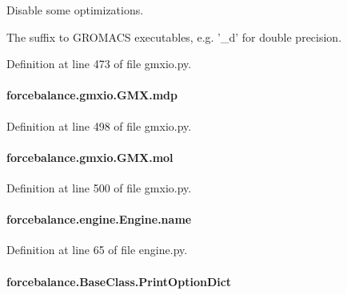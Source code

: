 Disable some optimizations. 

The suffix to G\-R\-O\-M\-A\-C\-S executables, e.\-g. '\-\_\-d' for double precision. 

Definition at line 473 of file gmxio.\-py.

\hypertarget{classforcebalance_1_1gmxio_1_1GMX_a6476e88d7e7aefec1fe2d07e30be2eb2}{
\paragraph[{mdp}]{\setlength{\rightskip}{0pt plus 5cm}forcebalance.\-gmxio.\-G\-M\-X.\-mdp}}\label{classforcebalance_1_1gmxio_1_1GMX_a6476e88d7e7aefec1fe2d07e30be2eb2}


Definition at line 498 of file gmxio.\-py.

\hypertarget{classforcebalance_1_1gmxio_1_1GMX_a7accb28dad3f9986cc8b622125feed5d}{
\paragraph[{mol}]{\setlength{\rightskip}{0pt plus 5cm}forcebalance.\-gmxio.\-G\-M\-X.\-mol}}\label{classforcebalance_1_1gmxio_1_1GMX_a7accb28dad3f9986cc8b622125feed5d}


Definition at line 500 of file gmxio.\-py.

\hypertarget{classforcebalance_1_1engine_1_1Engine_add3a4bf15527832034d88fb692a37115}{
\paragraph[{name}]{\setlength{\rightskip}{0pt plus 5cm}forcebalance.\-engine.\-Engine.\-name\hspace{0.3cm}{\ttfamily [inherited]}}}\label{classforcebalance_1_1engine_1_1Engine_add3a4bf15527832034d88fb692a37115}


Definition at line 65 of file engine.\-py.

\hypertarget{classforcebalance_1_1BaseClass_afc6659278497d7245bc492ecf405ccae}{
\paragraph[{Print\-Option\-Dict}]{\setlength{\rightskip}{0pt plus 5cm}forcebalance.\-Base\-Class.\-Print\-Option\-Dict\hspace{0.3cm}{\ttfamily [inherited]}}}\label{classforcebalance_1_1BaseClass_afc6659278497d7245bc492ecf405ccae}


